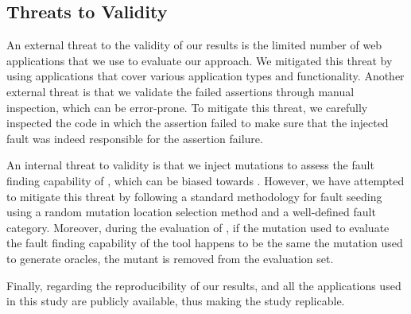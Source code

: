 \subsection{Threats to Validity} \label{threatsToValidity}

An external threat to the validity of our results is the limited number of web applications that we use to evaluate our approach. 
We mitigated this threat by using \javascript applications that cover various application types and functionality.
Another external threat is that we validate the failed assertions through manual inspection,  which can be error-prone. To mitigate this threat, we carefully inspected the code in which the assertion failed to make sure that the injected fault was indeed responsible for the assertion failure.

An internal threat to validity is that we inject mutations to assess the fault finding capability of \tool, which can be biased towards \tool. However, we have attempted  to mitigate this threat by following a standard methodology for fault seeding using a random mutation location selection method and a well-defined fault category.
 Moreover, during the evaluation of \tool, if the mutation used to evaluate the fault finding capability of the tool happens to be the same the mutation used to generate oracles, the mutant is removed from the evaluation set.     
 
 Finally, regarding the reproducibility of our results, \tool and all the applications used in this study are publicly available, thus making the study replicable.
